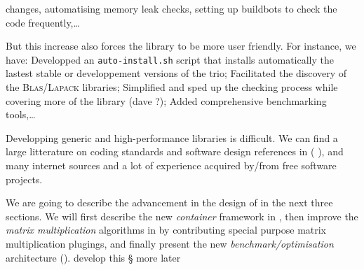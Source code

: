 changes, automatising memory leak checks, setting up buildbots to check the code
frequently,\dots
%
\par
%
But this increase also forces the library to be more user friendly. For
instance, we have: Developped an \texttt{auto-install.sh} script that installs
automatically the lastest stable or developpement versions of the trio;
Facilitated the discovery of the \textsc{Blas}/\textsc{Lapack} libraries;
Simplified and sped up the checking process while covering more of the library (\danger dave ?);
Added comprehensive benchmarking tools,\dots
%
%
\par
%
Developping generic and high-performance libraries is difficult. We can find a
large litterature on coding standards and software design references in (\cf{}
\cite{alexandrescu:01:modern,gamma:95:design,sutter:05:cpp,stroustrup1994design,Douglas:05:GPHP}),
and many internet sources and a lot of experience acquired by/from free
software projects.
%
\par
%
We are going to describe the advancement in the design of \linbox in the next
three sections. We will first describe the new \emph{container} framework in
, then improve the \emph{matrix multiplication} algorithms
in  by contributing special purpose matrix multiplication
plugings, and finally present the new \emph{benchmark/optimisation}
architecture ().
%
\danger develop this § more later
